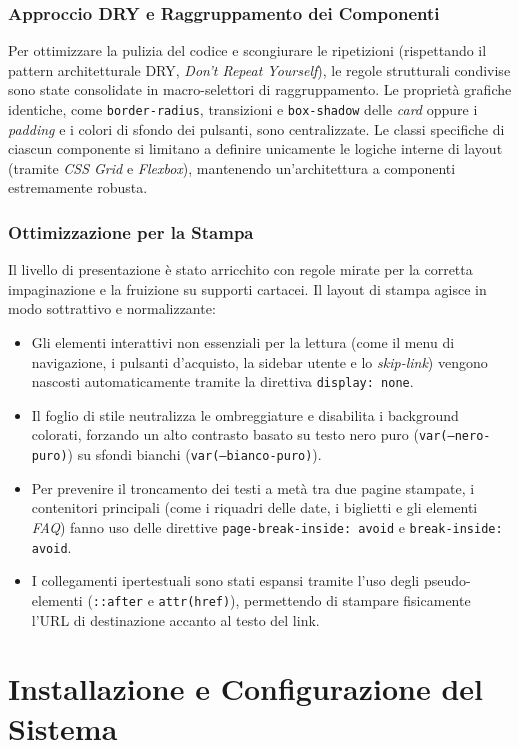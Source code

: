 \documentclass[11pt,a4paper]{article}
\begin{document}
\subsubsection{Approccio DRY e Raggruppamento dei Componenti}
Per ottimizzare la pulizia del codice e scongiurare le ripetizioni (rispettando il pattern architetturale DRY, \textit{Don't Repeat Yourself}), le regole strutturali condivise sono state consolidate in macro-selettori di raggruppamento. Le proprietà grafiche identiche, come \texttt{border-radius}, transizioni e \texttt{box-shadow} delle \textit{card} oppure i \textit{padding} e i colori di sfondo dei pulsanti, sono centralizzate. Le classi specifiche di ciascun componente si limitano a definire unicamente le logiche interne di layout (tramite \textit{CSS Grid} e \textit{Flexbox}), mantenendo un'architettura a componenti estremamente robusta.

\subsubsection{Ottimizzazione per la Stampa}
Il livello di presentazione è stato arricchito con regole mirate per la corretta impaginazione e la fruizione su supporti cartacei. Il layout di stampa agisce in modo sottrattivo e normalizzante:
\begin{itemize}
    \item Gli elementi interattivi non essenziali per la lettura (come il menu di navigazione, i pulsanti d'acquisto, la sidebar utente e lo \textit{skip-link}) vengono nascosti automaticamente tramite la direttiva \texttt{display: none}.
    \item Il foglio di stile neutralizza le ombreggiature e disabilita i background colorati, forzando un alto contrasto basato su testo nero puro (\texttt{var(--nero-puro)}) su sfondi bianchi (\texttt{var(--bianco-puro)}).
    \item Per prevenire il troncamento dei testi a metà tra due pagine stampate, i contenitori principali (come i riquadri delle date, i biglietti e gli elementi \textit{FAQ}) fanno uso delle direttive \texttt{page-break-inside: avoid} e \texttt{break-inside: avoid}.
    \item I collegamenti ipertestuali sono stati espansi tramite l'uso degli pseudo-elementi (\texttt{::after} e \texttt{attr(href)}), permettendo di stampare fisicamente l'URL di destinazione accanto al testo del link.
\end{itemize}

\section{Installazione e Configurazione del Sistema}
\end{document}
